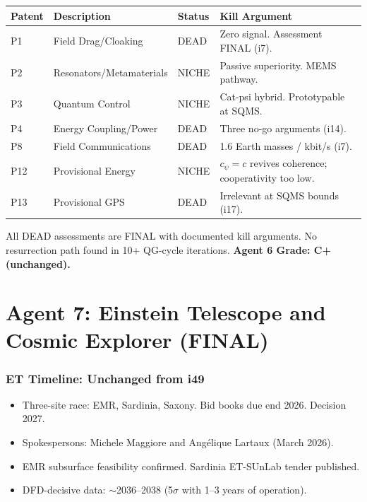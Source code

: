 \documentclass[11pt,a4paper]{article}
\begin{document}
\begin{center}
\begin{tabular}{llll}
\toprule
\textbf{Patent} & \textbf{Description} & \textbf{Status} & \textbf{Kill Argument} \\
\midrule
P1 & Field Drag/Cloaking & DEAD & Zero signal. Assessment FINAL (i7). \\
P2 & Resonators/Metamaterials & NICHE & Passive superiority. MEMS pathway. \\
P3 & Quantum Control & NICHE & Cat-psi hybrid. Prototypable at SQMS. \\
P4 & Energy Coupling/Power & DEAD & Three no-go arguments (i14). \\
P8 & Field Communications & DEAD & 1.6 Earth masses / kbit/s (i7). \\
P12 & Provisional Energy & NICHE & $c_\psi = c$ revives coherence; cooperativity too low. \\
P13 & Provisional GPS & DEAD & Irrelevant at SQMS bounds (i17). \\
\bottomrule
\end{tabular}
\end{center}

All DEAD assessments are FINAL with documented kill arguments. No resurrection path found in 10+ QG-cycle iterations. \textbf{Agent 6 Grade: C+ (unchanged).}


\part{Agent 7: Einstein Telescope and Cosmic Explorer (FINAL)}
\label{part:agent7}

\section{ET Timeline: Unchanged from i49}

\begin{itemize}
\item Three-site race: EMR, Sardinia, Saxony. Bid books due end 2026. Decision 2027.
\item Spokespersons: Michele Maggiore and Ang\'elique Lartaux (March 2026).
\item EMR subsurface feasibility confirmed. Sardinia ET-SUnLab tender published.
\item DFD-decisive data: $\sim$2036--2038 (5$\sigma$ with 1--3 years of operation).
\end{itemize}
\end{document}
